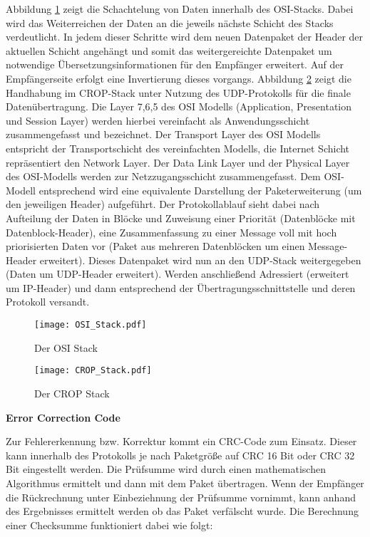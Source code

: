Abbildung \ref{fig:OSI_Stack} zeigt die Schachtelung von Daten innerhalb des
OSI-Stacks. Dabei wird das Weiterreichen der Daten an die jeweils n{\"a}chste
Schicht des Stacks verdeutlicht. In jedem dieser Schritte wird dem neuen
Datenpaket der Header der aktuellen Schicht angeh{\"a}ngt und somit das
weitergereichte Datenpaket um notwendige {\"U}bersetzungsinformationen f{\"u}r
den Empf{\"a}nger erweitert. Auf der Empf{\"a}ngerseite erfolgt eine Invertierung dieses
vorgangs. Abbildung \ref{fig:CROP_Stack} zeigt die Handhabung im CROP-Stack
unter Nutzung des UDP-Protokolls f{\"u}r die finale Daten{\"u}bertragung. Die Layer
7,6,5 des OSI Modells (Application, Presentation und Session Layer) werden
hierbei vereinfacht als Anwendungsschicht zusammengefasst und bezeichnet. Der
Transport Layer des OSI Modells entspricht der Transportschicht des
vereinfachten Modells, die Internet Schicht repr{\"a}sentiert den Network Layer.
Der Data Link Layer und der Physical Layer des OSI-Modells werden zur
Netzzugangsschicht zusammengefasst. Dem OSI-Modell entsprechend wird eine
equivalente Darstellung der Paketerweiterung (um den jeweiligen Header)
aufgef{\"u}hrt. Der Protokollablauf sieht dabei nach Aufteilung der Daten in Bl{\"o}cke
und Zuweisung einer Priorit{\"a}t (Datenbl{\"o}cke mit Datenblock-Header), eine
Zusammenfassung zu einer Message voll mit hoch priorisierten Daten vor (Paket
aus mehreren Datenbl{\"o}cken um einen Message-Header erweitert). Dieses Datenpaket
wird nun an den UDP-Stack weitergegeben (Daten um UDP-Header erweitert). Werden
anschlie{\ss}end Adressiert (erweitert um IP-Header) und dann entsprechend der
{\"U}bertragungsschnittstelle und deren Protokoll versandt.

\begin{figure}[H]
\centering
\texttt{[image: OSI\_Stack.pdf]}
\caption{Der OSI Stack}
\label{fig:OSI_Stack}
\end{figure}

\begin{figure}[H]
\centering
\texttt{[image: CROP\_Stack.pdf]}
\caption{Der CROP Stack}
\label{fig:CROP_Stack}
\end{figure}

\textbf{Error Correction Code}

Zur Fehlererkennung bzw. Korrektur kommt ein CRC-Code zum Einsatz. Dieser kann
innerhalb des Protokolls je nach Paketgr{\"o}{\ss}e auf CRC 16 Bit oder CRC 32
Bit eingestellt werden. Die Pr{\"u}fsumme wird durch einen mathematischen
Algorithmus ermittelt und dann mit dem Paket {\"u}bertragen. Wenn der
Empf{\"a}nger die R{\"u}ckrechnung unter Einbeziehnung der Pr{\"u}fsumme
vornimmt, kann anhand des Ergebnisses ermittelt werden ob das Paket
verf{\"a}lscht wurde. Die Berechnung einer Checksumme funktioniert dabei wie
folgt:

